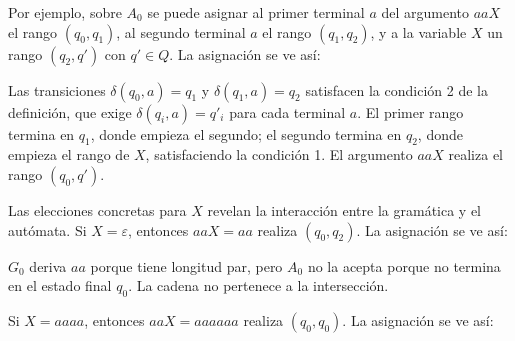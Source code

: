 \documentclass{report}
\theoremstyle{definition}
\theoremstyle{plain}
\theoremstyle{remark}
\begin{document}
Por ejemplo, sobre $A_0$ se puede asignar al primer terminal $a$ del
argumento $aaX$ el rango $(q_0, q_1)$, al segundo terminal $a$ el rango
$(q_1, q_2)$, y a la variable $X$ un rango $(q_2, q')$ con $q' \in Q$.
La asignación se ve así:

\begin{center}
\end{center}

Las transiciones $\delta(q_0, a) = q_1$ y $\delta(q_1, a) = q_2$
satisfacen la condición 2 de la definición, que exige
$\delta(q_i, a) = q'_i$ para cada terminal $a$. El primer rango termina en $q_1$, donde empieza el segundo; el segundo
termina en $q_2$, donde empieza el rango de $X$, satisfaciendo la
condición 1. El argumento $aaX$ realiza el
rango $(q_0, q')$.

Las elecciones concretas para $X$ revelan la interacción entre la
gramática y el autómata. Si $X = \varepsilon$, entonces $aaX = aa$
realiza $(q_0, q_2)$. La asignación se ve así:

\begin{center}
\end{center}

$G_0$ deriva $aa$ porque tiene longitud par, pero $A_0$ no la acepta
porque no termina en el estado final $q_0$. La cadena no pertenece a la
intersección.

Si $X = aaaa$, entonces $aaX = aaaaaa$ realiza $(q_0, q_0)$. La asignación se ve así:

\begin{center}
\end{center}
\end{document}
